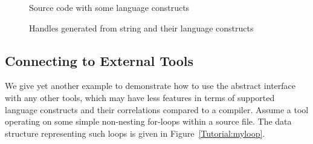 \begin{figure}[!h]
{\indent
{\mySmallestFontSize
\begin{latexonly}
  
\end{latexonly}

\begin{htmlonly}
   
\end{htmlonly}

}
}
\caption{Source code with some language constructs}
\label{Tutorial:abstractHandle2input}
\end{figure}


\begin{figure}[!h]
{\indent
{\mySmallestFontSize
\begin{latexonly}
  
\end{latexonly}

\begin{htmlonly}
   
\end{htmlonly}

}
}
\caption{Handles generated from string and their language constructs}
\label{Tutorial:abstractHandle2out}
\end{figure}

\subsection{Connecting to External Tools}
We give yet another example to demonstrate how to use the abstract interface
with any other tools, which may have less features in terms of
supported language constructs and their correlations compared to a compiler. 
Assume a tool operating on some simple non-nesting for-loops
within a source file. The data structure representing such loops is given
in Figure~\ref{Tutorial:myloop}.

